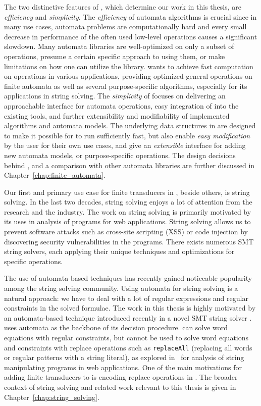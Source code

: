 The two distinctive features of \mata, which determine our work in this thesis, are \emph{efficiency} and \emph{simplicity}.
The \emph{efficiency} of automata algorithms is crucial since in many use cases, automata problems are computationally hard and every small decrease in performance of the often used low-level operations causes a significant slowdown.
Many automata libraries are well-optimized on only a subset of operations, presume a certain specific approach to using them, or make limitations on how one can utilize the library.
\mata wants to achieve fast computation on operations in various applications, providing optimized general operations on finite automata as well as several purpose-specific algorithms, especially for its applications in string solving.
The \emph{simplicity} of \mata focuses on delivering an approachable interface for automata operations, easy integration of \mata into the existing tools, and further extensibility and modifiability of implemented algorithms and automata models.
The underlying data structures in \mata are designed to make it possible for \mata to run sufficiently fast, but also enable \emph{easy modification} by the user for their own use cases, and give an \emph{extensible} interface for adding new automata models, or purpose-specific operations.
The design decisions behind \mata, and a comparison with other automata libraries are further discussed in Chapter~\ref{chap:finite_automata}.

Our first and primary use case for finite transducers in \mata, beside others, is string solving.
In the last two decades, string solving enjoys a lot of attention from the research and the industry.
The work on string solving is primarily motivated by its uses in analysis of programs for web applications.
String solving allows us to prevent software attacks such as cross-site scripting (XSS) or code injection by discovering security vulnerabilities in the programs.
There exists numerous SMT string solvers, each applying their unique techniques and optimizations for specific operations.

The use of automata-based techniques has recently gained noticeable popularity among the string solving community.
Using automata for string solving is a natural approach: we have to deal with a lot of regular expressions and regular constraints in the solved formulae.
The work in this thesis is highly motivated by an automata-based technique introduced recently in a novel SMT string solver \noodler.
\noodler uses automata as the backbone of its decision procedure.
\noodler can solve word equations with regular constraints, but cannot be used to solve word equations and constraints with replace operations such as \texttt{replaceAll} (replacing all words or regular patterns with a string literal), as explored in~\cite{10.1145/3158091} for analysis of string manipulating programs in web applications.
One of the main motivations for adding finite transducers to \mata is encoding replace operations in \noodler.
The broader context of string solving and related work relevant to this thesis is given in Chapter~\ref{chap:string_solving}.

